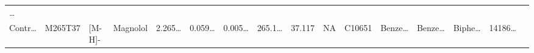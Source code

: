 \documentclass[
]{article}
\begin{document}
\begin{longtable}[]{@{}llllllllllllllll@{}}
\begin{minipage}[t]{0.02\columnwidth}
\ldots{}\strut
\end{minipage}\tabularnewline
\begin{minipage}[t]{0.04\columnwidth}\raggedright
Contr\ldots{}\strut
\end{minipage} & \begin{minipage}[t]{0.04\columnwidth}\raggedright
M265T37\strut
\end{minipage} & \begin{minipage}[t]{0.04\columnwidth}\raggedright
{[}M-H{]}-\strut
\end{minipage} & \begin{minipage}[t]{0.04\columnwidth}\raggedright
Magnolol\strut
\end{minipage} & \begin{minipage}[t]{0.04\columnwidth}\raggedright
2.265\ldots{}\strut
\end{minipage} & \begin{minipage}[t]{0.04\columnwidth}\raggedright
0.059\ldots{}\strut
\end{minipage} & \begin{minipage}[t]{0.04\columnwidth}\raggedright
0.005\ldots{}\strut
\end{minipage} & \begin{minipage}[t]{0.04\columnwidth}\raggedright
265.1\ldots{}\strut
\end{minipage} & \begin{minipage}[t]{0.04\columnwidth}\raggedright
37.117\strut
\end{minipage} & \begin{minipage}[t]{0.04\columnwidth}\raggedright
NA\strut
\end{minipage} & \begin{minipage}[t]{0.03\columnwidth}\raggedright
C10651\strut
\end{minipage} & \begin{minipage}[t]{0.04\columnwidth}\raggedright
Benze\ldots{}\strut
\end{minipage} & \begin{minipage}[t]{0.04\columnwidth}\raggedright
Benze\ldots{}\strut
\end{minipage} & \begin{minipage}[t]{0.04\columnwidth}\raggedright
Biphe\ldots{}\strut
\end{minipage} & \begin{minipage}[t]{0.04\columnwidth}\raggedright
14186\ldots{}\strut
\end{minipage} & \begin{minipage}[t]{0.02\columnwidth}\raggedright

\end{minipage}
\end{longtable}
\end{document}
